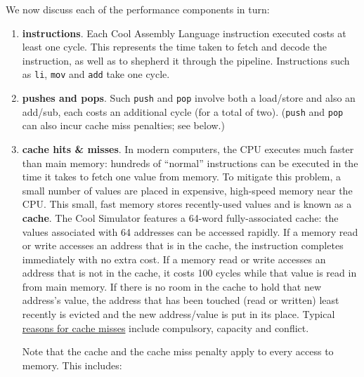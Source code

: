 \documentclass[]{article}
\begin{document}
We now discuss each of the performance components in turn:

\begin{enumerate}
\item
  \textbf{instructions}. Each Cool Assembly Language instruction
  executed costs at least one cycle. This represents the time taken to
  fetch and decode the instruction, as well as to shepherd it through
  the pipeline. Instructions such as \texttt{li}, \texttt{mov} and
  \texttt{add} take one cycle.
\item
  \textbf{pushes and pops}. Such \texttt{push} and \texttt{pop} involve
  both a load/store and also an add/sub, each costs an additional cycle
  (for a total of two). (\texttt{push} and \texttt{pop} can also incur
  cache miss penalties; see below.)
\item
  \textbf{cache hits \& misses}. In modern computers, the CPU executes
  much faster than main memory: hundreds of ``normal'' instructions can
  be executed in the time it takes to fetch one value from memory. To
  mitigate this problem, a small number of values are placed in
  expensive, high-speed memory near the CPU. This small, fast memory
  stores recently-used values and is known as a \textbf{cache}. The Cool
  Simulator features a 64-word fully-associated cache: the values
  associated with 64 addresses can be accessed rapidly. If a memory read
  or write accesses an address that is in the cache, the instruction
  completes immediately with no extra cost. If a memory read or write
  accesses an address that is not in the cache, it costs 100 cycles
  while that value is read in from main memory. If there is no room in
  the cache to hold that new address's value, the address that has been
  touched (read or written) least recently is evicted and the new
  address/value is put in its place. Typical
  \href{http://en.wikipedia.org/wiki/Cache_miss\#Cache_misses}{reasons
  for cache misses} include compulsory, capacity and conflict.

  Note that the cache and the cache miss penalty apply to every access
  to memory. This includes:


\end{enumerate}
\end{document}
